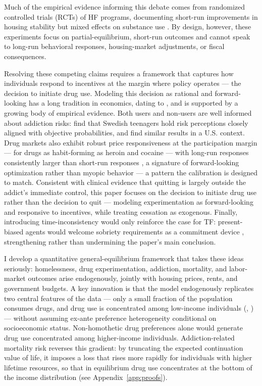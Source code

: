 \documentclass[parskip=full]{article}
\theoremstyle{plain}
\theoremstyle{definition}
\theoremstyle{remark}
\newcommand{\citepshort}[1]{(\citetalias{#1}, \citeyear{#1})}
\begin{document}
Much of the empirical evidence informing this debate comes from randomized controlled trials (RCTs) of HF programs, documenting short-run improvements in housing stability but mixed effects on substance use \citep{tsemberis2004housing,larimer2009housing,padgett2006housing,goering2014national,aubry2016housing}. By design, however, these experiments focus on partial-equilibrium, short-run outcomes and cannot speak to long-run behavioral responses, housing-market adjustments, or fiscal consequences.

Resolving these competing claims requires a framework that captures how individuals respond to incentives at the margin where policy operates — the decision to initiate drug use. Modeling this decision as rational and forward-looking has a long tradition in economics, 
dating to \citet{becker_murphy_1988}, and is supported by a growing body of empirical evidence. Both users and non-users are well informed about addiction risks: \citet{lundborg_lindgren_2002} find that Swedish teenagers hold risk perceptions closely aligned with objective probabilities, and \citet{greenwood_guner_kopecky_2025_downward_spiral} find similar results in a U.S. context. Drug markets also exhibit robust price responsiveness at the participation margin — for drugs as habit-forming as heroin and cocaine — with long-run responses consistently larger than short-run responses \citep{vanours1995price,saffer_chaloupka_1999,caulkins2001drug,gallet2014can}, a signature of forward-looking optimization rather than myopic 
behavior — a pattern the calibration is designed to match. Consistent with clinical evidence that quitting is largely outside the addict's immediate control, this paper focuses on the decision to initiate drug use rather than the decision to quit — modeling experimentation as forward-looking and responsive to incentives, while treating cessation as exogenous. Finally, introducing time-inconsistency would only 
reinforce the case for TF: present-biased agents would welcome sobriety requirements as a commitment device \citep{gruber_koszegi_2001,laibson1997golden,strotz1955myopia}, strengthening rather than undermining the paper's main conclusion.

I develop a quantitative general-equilibrium framework that takes these ideas seriously: homelessness, drug experimentation, addiction, mortality, and labor-market outcomes arise endogenously, jointly with housing prices, rents, and government budgets. A key innovation is that the model endogenously replicates two central features of the data — only a small fraction of the population consumes drugs, and drug use is concentrated among low-income individuals \citepshort{kuhn1998,SAMHSA_2023,nsduh_2024} — without assuming ex-ante preference heterogeneity conditional on socioeconomic status. Non-homothetic drug preferences alone would generate drug use concentrated among higher-income individuals. Addiction-related mortality risk reverses this gradient: by truncating the expected continuation value of life, it imposes a loss that rises more rapidly for individuals with higher lifetime resources, so that in equilibrium drug use concentrates at the bottom of the income distribution (see Appendix~\ref{app:proofs}).
\end{document}

